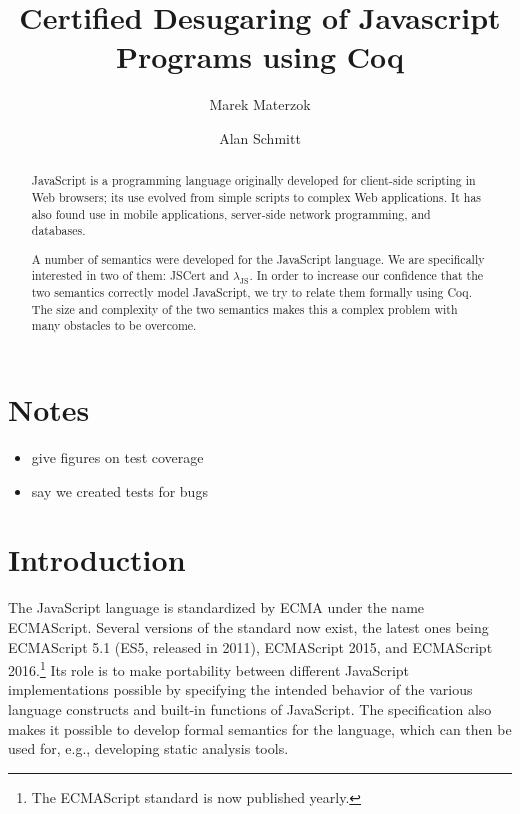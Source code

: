 \documentclass{llncs}
\begin{document}
\title{Certified Desugaring of Javascript Programs using Coq}

\author{Marek Materzok \and Alan Schmitt}

\maketitle

\newcommand{\lambdajs}{$\lambda_\textrm{JS}$\xspace}

\begin{abstract}
JavaScript is a programming language originally developed for client-side
scripting in Web browsers; its use evolved from simple scripts to
complex Web applications. It has also found use in mobile applications,
server-side network programming, and databases.

A number of semantics were developed for the JavaScript language.
We are specifically interested in two of them: JSCert and \lambdajs.
In order to increase our confidence that the two semantics correctly
model JavaScript, we try to relate them formally using Coq. The size and complexity
of the two semantics makes this a complex problem with many obstacles
to be overcome.
\end{abstract}

\section{Notes}

\begin{itemize}
\item give figures on test coverage
\item say we created tests for bugs
\end{itemize}

\section{Introduction}

The JavaScript language is standardized by ECMA under the name
ECMAScript. Several versions of the standard now exist, the latest
ones being ECMAScript 5.1 (ES5, released in 2011), ECMAScript 2015, and
ECMAScript 2016.\footnote{The ECMAScript standard is now published yearly.} Its role is to make portability between different
JavaScript implementations possible by specifying the intended behavior
of the various language constructs and built-in functions of JavaScript.
The specification also makes it possible to develop formal semantics
for the language, which can then be used for, e.g., developing
static analysis tools.
\end{document}
